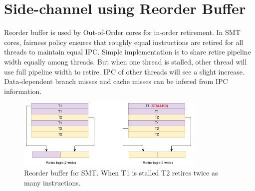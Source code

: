 \chapter{Side-channel using Reorder Buffer}

Reorder buffer is used by Out-of-Order cores for in-order retirement.
In SMT cores, fairness policy ensures that roughly equal instructions are retired for all threads to maintain equal IPC.
Simple implementation is to share retire pipeline width equally among threads.
But when one thread is stalled, other thread will use full pipeline width to retire.
IPC of other threads will see a slight increase.
Data-dependent branch misses and cache misses can be infered from IPC information.

\begin{figure}
    \centering
    \includegraphics[width=0.8\textwidth]{figures/rob_side_channel}
    \caption{Reorder buffer for SMT. When T1 is stalled T2 retires twice as
    many instructions.}
\end{figure}
